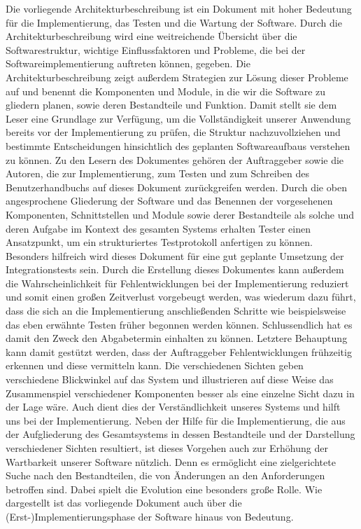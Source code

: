 \documentclass[enabledeprecatedfontcommands,fontsize=11pt,paper=a4,twoside]{scrartcl}
\newcounter{one}
\begin{document}
Die vorliegende Architekturbeschreibung ist ein Dokument mit hoher Bedeutung für die Implementierung, das Testen und die Wartung der Software. Durch die Architekturbeschreibung wird eine weitreichende Übersicht über die Softwarestruktur, wichtige Einflussfaktoren und Probleme, die bei der Softwareimplementierung auftreten können, gegeben. Die Architekturbeschreibung zeigt außerdem Strategien zur Lösung dieser Probleme auf und benennt die Komponenten und Module, in die wir die Software zu gliedern planen, sowie deren Bestandteile und Funktion. Damit stellt sie dem Leser eine Grundlage zur Verfügung, um die Vollständigkeit unserer Anwendung bereits vor der Implementierung zu prüfen, die Struktur nachzuvollziehen und bestimmte Entscheidungen hinsichtlich des geplanten Softwareaufbaus verstehen zu können. Zu den Lesern des Dokumentes gehören der Auftraggeber sowie die Autoren, die zur Implementierung, zum Testen und zum Schreiben des Benutzerhandbuchs auf dieses Dokument zurückgreifen werden. Durch die oben angesprochene Gliederung der Software und das Benennen der vorgesehenen Komponenten, Schnittstellen und Module sowie derer Bestandteile als solche und deren Aufgabe im Kontext des gesamten Systems erhalten Tester einen Ansatzpunkt, um ein strukturiertes Testprotokoll anfertigen zu können. Besonders hilfreich wird dieses Dokument für eine gut geplante Umsetzung der Integrationstests sein. Durch die Erstellung dieses Dokumentes kann außerdem die Wahrscheinlichkeit für Fehlentwicklungen bei der Implementierung reduziert und somit einen großen Zeitverlust vorgebeugt werden, was wiederum dazu führt, dass die sich an die Implementierung anschließenden Schritte wie beispielsweise das eben erwähnte Testen früher begonnen werden können. Schlussendlich hat es damit den Zweck den Abgabetermin einhalten zu können. Letztere Behauptung kann damit gestützt werden,  dass der Auftraggeber Fehlentwicklungen frühzeitig erkennen und diese vermitteln kann. Die verschiedenen Sichten geben verschiedene Blickwinkel auf das System und illustrieren auf diese Weise das Zusammenspiel verschiedener Komponenten besser als eine einzelne Sicht dazu in der Lage wäre. Auch dient dies der Verständlichkeit unseres Systems und hilft uns bei der Implementierung. Neben der Hilfe für die Implementierung, die aus der Aufgliederung des Gesamtsystems in dessen Bestandteile und der Darstellung verschiedener Sichten resultiert, ist dieses Vorgehen auch zur Erhöhung der Wartbarkeit unserer Software nützlich. Denn es ermöglicht eine zielgerichtete Suche nach den Bestandteilen, die von Änderungen an den Anforderungen betroffen sind. Dabei spielt die Evolution eine besonders große Rolle. Wie dargestellt ist das vorliegende Dokument auch über die (Erst-)Implementierungsphase der Software hinaus von Bedeutung.
\newpage
\end{document}
